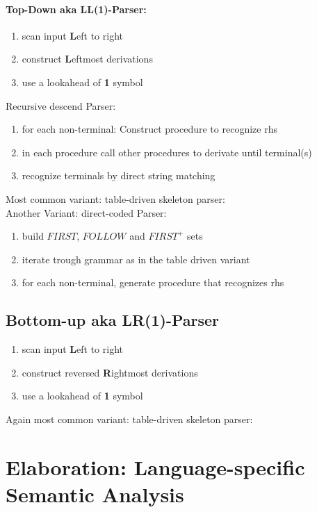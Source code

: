 \paragraph{Top-Down aka LL(1)-Parser:}
\begin{enumerate}
    \item scan input \textbf{L}eft to right
    \item construct \textbf{L}eftmost derivations
    \item use a lookahead of \textbf{1} symbol
\end{enumerate}
Recursive descend Parser:\\
\begin{enumerate}
    \item for each non-terminal: Construct procedure to recognize rhs
    \item in each procedure call other procedures to derivate until terminal(s)
    \item recognize terminals by direct string matching
\end{enumerate}
Most common variant: table-driven skeleton parser: \\
Another Variant: direct-coded Parser: \\
\begin{enumerate}
    \item build $FIRST$, $FOLLOW$ and $FIRST^+$ sets 
    \item iterate trough grammar as in the table driven variant
    \item for each non-terminal, generate procedure that recognizes rhs
\end{enumerate}

\subsection{Bottom-up aka LR(1)-Parser}
\begin{enumerate}
    \item scan input \textbf{L}eft to right
    \item construct reversed \textbf{R}ightmost derivations
    \item use a lookahead of \textbf{1} symbol
\end{enumerate}
Again most common variant: table-driven skeleton parser: \\



\section{Elaboration: Language-specific Semantic Analysis}
